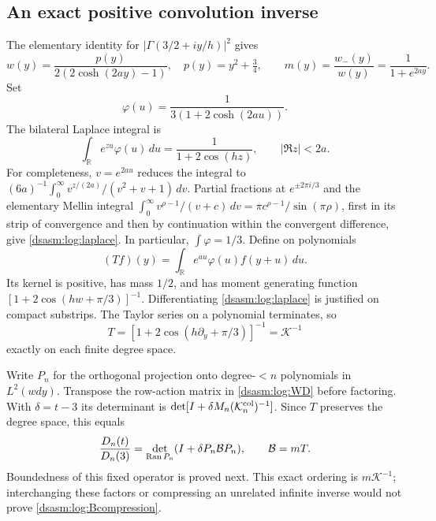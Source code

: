 \documentclass[11pt,letterpaper]{article}
\theoremstyle{remark}\newtheorem{remark}[theorem]{Remark}
\newcommand{\R}{\mathbb R}\newcommand{\C}{\mathbb C}\newcommand{\N}{\mathbb N}
\begin{document}
\subsection{An exact positive convolution inverse}
The elementary identity for $|\Gamma(3/2+iy/h)|^2$ gives
\begin{equation}\label{dsasm:log:wexplicit}
 w(y)=\frac{p(y)}{2(2\cosh(2ay)-1)},\quad p(y)=y^2+\tfrac34,
 \qquad m(y)=\frac{w_-(y)}{w(y)}=\frac1{1+e^{2ay}}.
\end{equation}
Set
\begin{equation}\label{dsasm:log:phi}
 \varphi(u)=\frac1{3(1+2\cosh(2au))}.
\end{equation}
The bilateral Laplace integral is
\begin{equation}\label{dsasm:log:laplace}
 \int_{\R}e^{zu}\varphi(u)\,du=\frac1{1+2\cos(hz)},
 \qquad |\Re z|<2a.
\end{equation}
For completeness, $v=e^{2au}$ reduces the integral to
$(6a)^{-1}\int_0^\infty v^{z/(2a)}/(v^2+v+1)\,dv$.
Partial fractions at $e^{\pm2\pi i/3}$ and the elementary Mellin
integral $\int_0^\infty v^{\rho-1}/(v+c)\,dv
=\pi c^{\rho-1}/\sin(\pi\rho)$, first in its strip of convergence
and then by continuation within the convergent difference, give
\eqref{dsasm:log:laplace}. In particular, $\int\varphi=1/3$.
Define on polynomials
\[
 (Tf)(y)=\int_{\R}e^{au}\varphi(u)f(y+u)\,du.
\]
Its kernel is positive, has mass $1/2$, and has moment generating
function $[1+2\cos(hw+\pi/3)]^{-1}$. Differentiating
\eqref{dsasm:log:laplace} is justified on compact substrips. The Taylor series
on a polynomial terminates, so
\begin{equation}\label{dsasm:log:Tinverse}
 T=[1+2\cos(h\partial_y+\pi/3)]^{-1}=\mathcal K^{-1}
\end{equation}
exactly on each finite degree space.

Write $P_n$ for the orthogonal projection onto degree-$<n$
polynomials in $L^2(wdy)$. Transpose the row-action matrix in
\eqref{dsasm:log:WD} before factoring. With $\delta=t-3$ its determinant is
$\det[I+\delta M_n(\mathcal K_n^{\rm col})^{-1}]$.
Since $T$ preserves the degree space, this equals
\begin{equation}\label{dsasm:log:Bcompression}
 \frac{D_n(t)}{D_n(3)}=\det_{\operatorname{Ran} P_n}(I+\delta P_n\mathcal B P_n),
 \qquad \mathcal B=mT.
\end{equation}
Boundedness of this fixed operator is proved next. This exact ordering
is $m\mathcal K^{-1}$; interchanging these factors or compressing
an unrelated infinite inverse would not prove \eqref{dsasm:log:Bcompression}.
\end{document}

